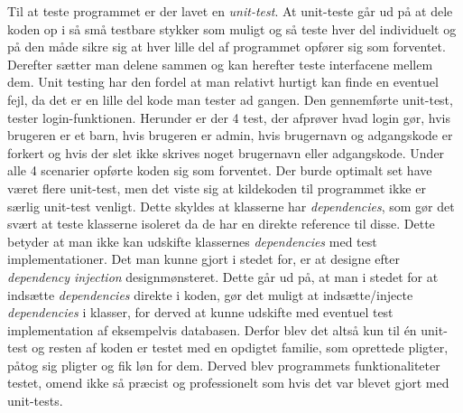 Til at teste programmet er der lavet en \textit{unit-test}. At unit-teste går ud på at dele koden op i så små testbare stykker som muligt og så teste hver del individuelt og på den måde sikre sig at hver lille del af programmet opfører sig som forventet. Derefter sætter man delene sammen og kan herefter teste interfacene mellem dem.
Unit testing har den fordel at man relativt hurtigt kan finde en eventuel fejl, da det er en lille del kode man tester ad gangen. 
Den gennemførte unit-test, tester login-funktionen. Herunder er der 4 test, der afprøver hvad login gør, hvis brugeren er et barn, hvis brugeren er admin, hvis brugernavn og adgangskode er forkert og hvis der slet ikke skrives noget brugernavn eller adgangskode. Under alle 4 scenarier opførte koden sig som forventet. Der burde optimalt set have været flere unit-test, men det viste sig at kildekoden til programmet ikke er særlig unit-test venligt. Dette skyldes at klasserne har \textit{dependencies}, som gør det svært at teste klasserne isoleret da de har en direkte reference til disse. Dette betyder at man ikke kan udskifte klassernes \textit{dependencies} med test implementationer. Det man kunne gjort i stedet for, er at designe efter \textit{dependency injection} designmønsteret. Dette går ud på, at man i stedet for at indsætte \textit{dependencies} direkte i koden, gør det muligt at indsætte/injecte \textit{dependencies} i klasser, for derved at kunne udskifte med eventuel test implementation af eksempelvis databasen.
Derfor blev det altså kun til én unit-test og resten af koden er testet med en opdigtet familie, som oprettede pligter, påtog sig pligter og fik løn for dem. Derved blev programmets funktionaliteter testet, omend ikke så præcist og professionelt som hvis det var blevet gjort med unit-tests. 

